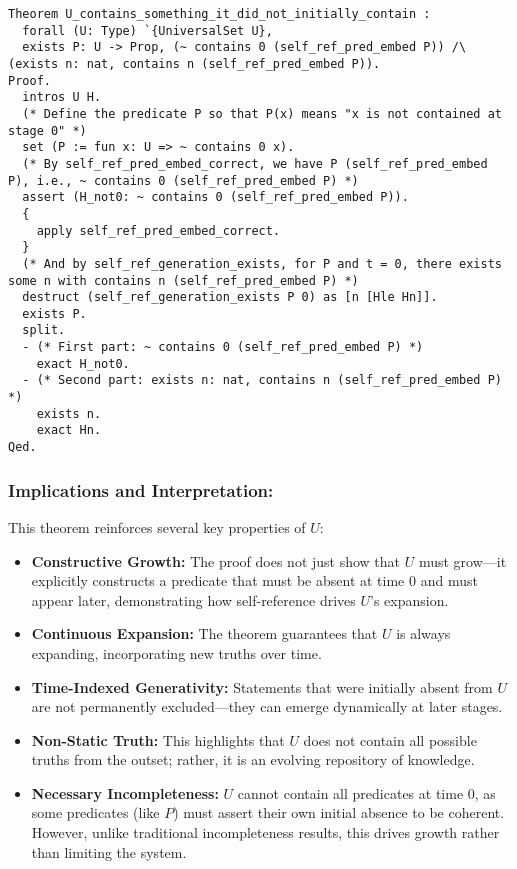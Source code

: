 \documentclass[12pt]{article}
\begin{document}
\begin{lstlisting}[language=Coq]
Theorem U_contains_something_it_did_not_initially_contain :
  forall (U: Type) `{UniversalSet U},
  exists P: U -> Prop, (~ contains 0 (self_ref_pred_embed P)) /\ (exists n: nat, contains n (self_ref_pred_embed P)).
Proof.
  intros U H.
  (* Define the predicate P so that P(x) means "x is not contained at stage 0" *)
  set (P := fun x: U => ~ contains 0 x).
  (* By self_ref_pred_embed_correct, we have P (self_ref_pred_embed P), i.e., ~ contains 0 (self_ref_pred_embed P) *)
  assert (H_not0: ~ contains 0 (self_ref_pred_embed P)).
  {
    apply self_ref_pred_embed_correct.
  }
  (* And by self_ref_generation_exists, for P and t = 0, there exists some n with contains n (self_ref_pred_embed P) *)
  destruct (self_ref_generation_exists P 0) as [n [Hle Hn]].
  exists P.
  split.
  - (* First part: ~ contains 0 (self_ref_pred_embed P) *)
    exact H_not0.
  - (* Second part: exists n: nat, contains n (self_ref_pred_embed P) *)
    exists n.
    exact Hn.
Qed.
\end{lstlisting}

\subsubsection{Implications and Interpretation:}
This theorem reinforces several key properties of \( U \):

\begin{itemize}
    \item \textbf{Constructive Growth:} The proof does not just show that \( U \) must grow—it explicitly constructs a predicate that must be absent at time \( 0 \) and must appear later, demonstrating how self-reference drives \( U \)'s expansion.
    \item \textbf{Continuous Expansion:} The theorem guarantees that \( U \) is always expanding, incorporating new truths over time.
    \item \textbf{Time-Indexed Generativity:} Statements that were initially absent from \( U \) are not permanently excluded—they can emerge dynamically at later stages.
    \item \textbf{Non-Static Truth:} This highlights that \( U \) does not contain all possible truths from the outset; rather, it is an evolving repository of knowledge.
    \item \textbf{Necessary Incompleteness:} \( U \) cannot contain all predicates at time \( 0 \), as some predicates (like \( P \)) must assert their own initial absence to be coherent. However, unlike traditional incompleteness results, this drives growth rather than limiting the system.
\end{itemize}
\end{document}
